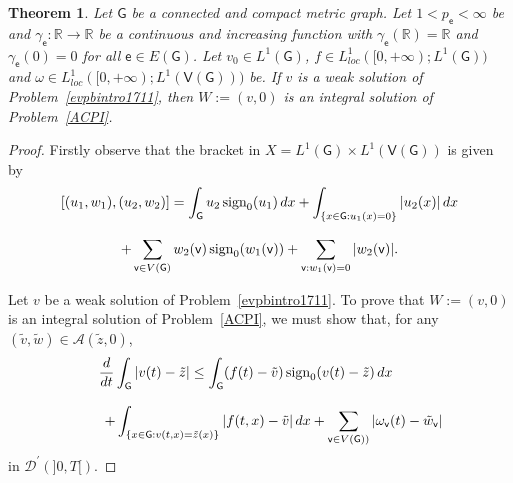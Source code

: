 \documentclass[reqno,12pt]{amsart}
\newtheorem{theorem}{Theorem}[section]
\def\R{\mathbb R} %
\def\e{\mathsf{e}} 	%
\def\v{\mathsf{v}}	%
\newcommand{\G}{\mathsf{G}}	%
\newcommand{\V}{\mathsf{V}}	%
\numberwithin{equation}{section} %
\begin{document}
\begin{theorem} \label{uniqweak001}
Let  $\G$ be a  connected and compact metric graph.
  Let $1 < p_\e < \infty$ be and   $\gamma_\e:\R\to \R$ be a continuous and increasing function with $\gamma_\e(\mathbb{R})=\mathbb{R}$ and $\gamma_\e(0)=0$ for all $\e \in E(\G)$.  Let $v_0 \in L^1(\G)$, $f\in L^1_{loc}([0,+\infty);L^{1}(\G))$  and $\omega\in L^1_{loc}([0,+\infty);L^1(\V(\G)))$ be. 
If $v$ is a  weak solution of Problem~\eqref{evpbintro1711}, then $W:= (v,0)$ is an integral solution of Problem~\eqref{ACPI}. 
\end{theorem}
 

\begin{proof}   Firstly observe that the bracket in  $X =L^{1}(\G)\times L^1(\V(\G))$ is given by 
$$\begin{array}{c}\displaystyle[(u_1,w_1),(u_2,w_2)] = \int_\G u_2 \, \hbox{sign}_0 ( u_1) \,  dx + \int_{\{x\in \G:u_1(x) =0 \}} \vert u_2(x) \vert \, dx \\ \\
\displaystyle+ \sum_{\v \in V(\G)} w_2(\v) \,  \hbox{sign}_0 ( w_1(\v))  + \sum_{\v:w_1(\v) =0}  \vert w_2(\v) \vert.
\end{array}$$ 

 Let $v$ be a weak solution of Problem~\eqref{evpbintro1711}.
To prove that $W:= (v,0)$ is an integral solution of Problem~\eqref{ACPI},  we must  show that, for any $(\tilde{v},\tilde{w}) \in \mathcal{A}(\tilde{z}, 0)$, 
\begin{equation}\label{E2IntWeakneeds01}   \begin{array}{c} 
\displaystyle \frac{d}{dt} \int_\G \vert v(t) - \tilde{z} \vert \leq \int_\G (f(t)- \tilde{v}) \, \hbox{sign}_0 ( v(t)- \tilde{z}) \,  dx     \qquad \\ \\
\displaystyle \qquad + \int_{\{x\in\G:v(t,x) = \tilde{z}(x) \}} \vert  f(t,x)- \tilde{v} \vert \, dx
+ \sum_{\v \in V(\G)) }  \vert \omega_\v(t)  - \tilde{w}_\v\vert
\end{array}
\end{equation}
in $\mathcal{D}^{\prime}(]0,T[)$.


\end{proof}
\end{document}
